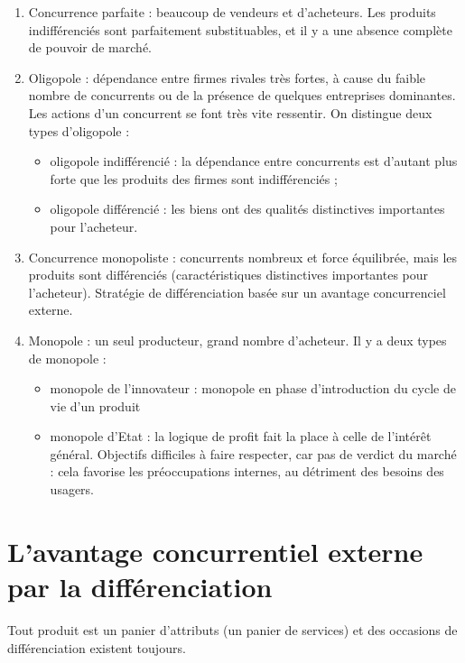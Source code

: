 	\begin{enumerate}
		\item Concurrence parfaite : beaucoup de vendeurs et d'acheteurs. Les produits indifférenciés sont parfaitement substituables, et il y a une absence complète de pouvoir de marché.
		\item Oligopole : dépendance entre firmes rivales très fortes, à cause du faible nombre de concurrents ou de la présence de quelques entreprises dominantes. Les actions d'un concurrent se font très vite ressentir. On distingue deux types d'oligopole :
		
		\begin{itemize}
			\item oligopole indifférencié : la dépendance entre concurrents est d'autant plus forte que les produits des firmes sont indifférenciés ;
			\item oligopole différencié : les biens ont des qualités distinctives importantes pour l'acheteur.
		\end{itemize}
		
		\item Concurrence monopoliste : concurrents nombreux et force équilibrée, mais les produits sont différenciés (caractéristiques distinctives importantes pour l'acheteur). Stratégie de différenciation basée sur un avantage concurrenciel externe. 
		
		\item Monopole : un seul producteur, grand nombre d'acheteur. Il y a deux types de monopole : 
			\begin{itemize}
				\item monopole de l'innovateur : monopole en phase d'introduction du cycle de vie d'un produit
				\item monopole d'Etat : la logique de profit fait la place à celle de l'intérêt général. Objectifs difficiles à faire respecter, car pas de verdict du marché : cela favorise les préoccupations internes, au détriment des besoins des usagers.
			\end{itemize}
	\end{enumerate}
	
	
	\section{L'avantage concurrentiel externe par la différenciation}
	
	Tout produit est un panier d'attributs (un panier de services) et des occasions de différenciation existent toujours. \\
		
